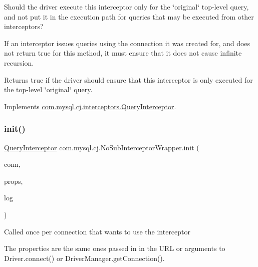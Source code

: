 Should the driver execute this interceptor only for the \char`\"{}original\char`\"{} top-\/level query, and not put it in the execution path for queries that may be executed from other interceptors?

If an interceptor issues queries using the connection it was created for, and does not return {\ttfamily true} for this method, it must ensure that it does not cause infinite recursion.

\begin{DoxyReturn}{Returns}
true if the driver should ensure that this interceptor is only executed for the top-\/level \char`\"{}original\char`\"{} query. 
\end{DoxyReturn}


Implements \mbox{\hyperlink{interfacecom_1_1mysql_1_1cj_1_1interceptors_1_1_query_interceptor_ab12edf90713df907ba400dbe3ba03ea6}{com.\+mysql.\+cj.\+interceptors.\+Query\+Interceptor}}.

\mbox{\label{classcom_1_1mysql_1_1cj_1_1_no_sub_interceptor_wrapper_a1d037e783990bcd80c1ce5a16a1cf254}} 
\subsubsection{\texorpdfstring{init()}{init()}}
{\footnotesize\ttfamily \mbox{\hyperlink{interfacecom_1_1mysql_1_1cj_1_1interceptors_1_1_query_interceptor}{Query\+Interceptor}} com.\+mysql.\+cj.\+No\+Sub\+Interceptor\+Wrapper.\+init (\begin{DoxyParamCaption}\item[{\mbox{\hyperlink{interfacecom_1_1mysql_1_1cj_1_1_mysql_connection}{Mysql\+Connection}}}]{conn,  }\item[{Properties}]{props,  }\item[{\mbox{\hyperlink{interfacecom_1_1mysql_1_1cj_1_1log_1_1_log}{Log}}}]{log }\end{DoxyParamCaption})}

Called once per connection that wants to use the interceptor

The properties are the same ones passed in in the U\+RL or arguments to Driver.\+connect() or Driver\+Manager.\+get\+Connection().


